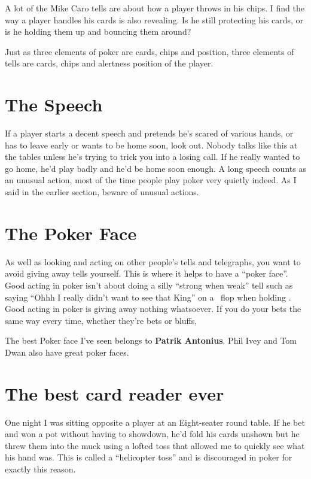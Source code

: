 A lot of the Mike Caro tells are about how a player
throws in his chips. I find the way a player
handles his cards is also revealing. Is he still protecting
his cards, or is he holding them up and bouncing them around?

Just as three elements of poker are cards, chips and position,
three elements of tells are cards, chips and alertness position
of the player.

\section{The Speech}

If a player starts a decent speech and pretends he's scared of various
hands, or has to leave early or wants to be home soon, look out.
Nobody talks like this at the tables unless he's trying to trick
you into a losing call. If he really wanted to go home, he'd play
badly and he'd be home soon enough. A long speech counts as an unusual
action, most of the time people play poker very quietly indeed. As I
said in the earlier section, beware of unusual actions.

\section{The Poker Face}

As well as looking and acting on other people's tells and telegraphs,
you want to avoid giving away tells yourself. This is where it helps
to have a ``poker face''. Good acting in poker isn't about doing
a silly ``strong when weak'' tell such as saying ``Ohhh I really
didn't want to see that King'' on a \Kh\Qd\eigc\ flop when holding \Ks\Kc.
Good acting in poker is giving away nothing whatsoever. If you do your
bets the same way every time, whether they're bets or bluffs, 

The best Poker face I've seen belongs to \textbf{Patrik
Antonius}. Phil Ivey and Tom Dwan also have great poker faces.

\section{The best card reader ever}

One night I was sitting opposite a player at an Eight-seater round
table. If he bet and won a pot without having to showdown, he'd
fold his cards unshown but he threw them into the muck using a lofted toss
that allowed me to quickly see what his hand was. This is called
a ``helicopter toss'' and is discouraged in poker for exactly this reason.

